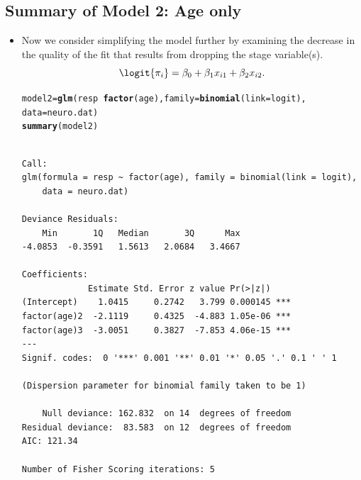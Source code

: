 \documentclass{article}\usepackage[]{graphicx}\usepackage[svgnames]{xcolor}
\makeatletter
\newcommand{\hlopt}[1]{\textcolor[rgb]{0,0,0}{#1}}%
\newcommand{\hlstd}[1]{\textcolor[rgb]{0.345,0.345,0.345}{#1}}%
\newcommand{\hlkwb}[1]{\textcolor[rgb]{0.69,0.353,0.396}{#1}}%
\newcommand{\hlkwc}[1]{\textcolor[rgb]{0.333,0.667,0.333}{#1}}%
\newcommand{\hlkwd}[1]{\textcolor[rgb]{0.737,0.353,0.396}{\textbf{#1}}}%
\newenvironment{kframe}{%
 \def\at@end@of@kframe{}%
 \ifinner\ifhmode%
  \def\at@end@of@kframe{\end{minipage}}%
  \begin{minipage}{\columnwidth}%
 \fi\fi%
 \def\FrameCommand##1{\hskip\@totalleftmargin \hskip-\fboxsep
 \colorbox{shadecolor}{##1}\hskip-\fboxsep
     \hskip-\linewidth \hskip-\@totalleftmargin \hskip\columnwidth}%
 \MakeFramed {\advance\hsize-\width
   \@totalleftmargin\z@ \linewidth\hsize
   \@setminipage}}%
 {\par\unskip\endMakeFramed%
 \at@end@of@kframe}
\newenvironment{knitrout}{}{} %
\makeatother
\begin{document}
\subsection*{Summary of Model 2: Age only}
\begin{itemize}
    \item Now we consider simplifying the model further by examining the decrease in
          the quality of the fit that results from dropping the stage variable(s).
          \[ \logit{\pi_i}=\beta_0+\beta_1x_{i1}+\beta_2x_{i2}. \]
\begin{knitrout}
\color{fgcolor}\begin{kframe}
\begin{alltt}
\hlstd{model2} \hlkwb{=} \hlkwd{glm}\hlstd{(resp} \hlopt{~} \hlkwd{factor}\hlstd{(age),} \hlkwc{family} \hlstd{=} \hlkwd{binomial}\hlstd{(}\hlkwc{link} \hlstd{= logit),}
  \hlkwc{data} \hlstd{= neuro.dat)}
\hlkwd{summary}\hlstd{(model2)}
\end{alltt}
\begin{verbatim}

Call:
glm(formula = resp ~ factor(age), family = binomial(link = logit), 
    data = neuro.dat)

Deviance Residuals: 
    Min       1Q   Median       3Q      Max  
-4.0853  -0.3591   1.5613   2.0684   3.4667  

Coefficients:
             Estimate Std. Error z value Pr(>|z|)    
(Intercept)    1.0415     0.2742   3.799 0.000145 ***
factor(age)2  -2.1119     0.4325  -4.883 1.05e-06 ***
factor(age)3  -3.0051     0.3827  -7.853 4.06e-15 ***
---
Signif. codes:  0 '***' 0.001 '**' 0.01 '*' 0.05 '.' 0.1 ' ' 1

(Dispersion parameter for binomial family taken to be 1)

    Null deviance: 162.832  on 14  degrees of freedom
Residual deviance:  83.583  on 12  degrees of freedom
AIC: 121.34

Number of Fisher Scoring iterations: 5
\end{verbatim}
\end{kframe}
\end{knitrout}
\end{itemize}
\end{document}
